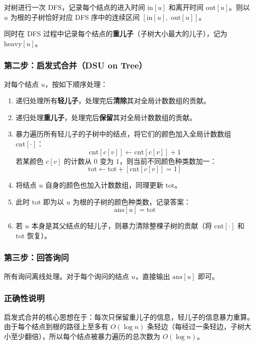 \documentclass[11pt,a4paper,twocolumn]{ctexart}  %
\begin{document}
对树进行一次 DFS，记录每个结点的进入时间 $\mathrm{in}[u]$ 和离开时间 $\mathrm{out}[u]$。则以 $u$ 为根的子树恰好对应 DFS 序中的连续区间 $[\mathrm{in}[u],\;\mathrm{out}[u]]$。

同时在 DFS 过程中记录每个结点的\textbf{重儿子}（子树大小最大的儿子），记为 $\mathrm{heavy}[u]$。

\subsubsection*{第二步：启发式合并（DSU on Tree）}

对每个结点 $u$，按如下顺序处理：

\begin{enumerate}
    \item 递归处理所有\textbf{轻儿子}，处理完后\textbf{清除}其对全局计数数组的贡献。
    \item 递归处理\textbf{重儿子}，处理完后\textbf{保留}其对全局计数数组的贡献。
    \item 暴力遍历所有轻儿子的子树中的结点，将它们的颜色加入全局计数数组 $\mathrm{cnt}[\cdot]$：
    \[
        \mathrm{cnt}[c[v]] \leftarrow \mathrm{cnt}[c[v]] + 1
    \]
    若某颜色 $c[v]$ 的计数从 $0$ 变为 $1$，则当前不同颜色种类数加一：
    \[
        \mathrm{tot} \leftarrow \mathrm{tot} + [\mathrm{cnt}[c[v]] = 1]
    \]
    \item 将结点 $u$ 自身的颜色也加入计数数组，同理更新 $\mathrm{tot}$。
    \item 此时 $\mathrm{tot}$ 即为以 $u$ 为根的子树的颜色种类数，记录答案：
    \[
        \mathrm{ans}[u] = \mathrm{tot}
    \]
    \item 若 $u$ 本身是其父结点的轻儿子，则暴力清除整棵子树的贡献（将 $\mathrm{cnt}[\cdot]$ 和 $\mathrm{tot}$ 恢复）。
\end{enumerate}

\subsubsection*{第三步：回答询问}

所有询问离线处理。对于每个询问的结点 $u$，直接输出 $\mathrm{ans}[u]$ 即可。

\subsubsection*{正确性说明}

启发式合并的核心思想在于：每次只保留重儿子的信息，轻儿子的信息暴力重算。由于每个结点到根的路径上至多有 $O(\log n)$ 条轻边（每经过一条轻边，子树大小至少翻倍），所以每个结点被暴力遍历的总次数为 $O(\log n)$。
\end{document}
